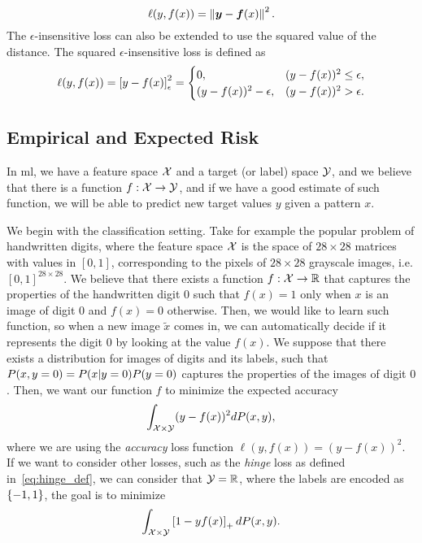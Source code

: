 \begin{equation}
    \label{eq:sqmulti_def}
    \lossf(y, f(x)) =  \norm{\fv{y} - \fv{f}(x)}^2.
\end{equation}
%
The $\epsilon$-insensitive loss can also be extended to use the squared value of the distance. The squared $\epsilon$-insensitive loss is defined as
\begin{equation}
    \label{eq:sqepsins_def}
    \lossf(y, f(x)) = \epsins{y - f(x)}^2 =
    \begin{cases}
        0, & (y - f(x))^2 \leq \epsilon ,\\
        (y - f(x))^2 - \epsilon, & (y - f(x))^2 > \epsilon .\\
    \end{cases}
\end{equation} 

\subsection{Empirical and Expected Risk} 
In \acrshort{ml}, we have a feature space $\mathcal{X}$ and a target (or label) space $\mathcal{Y}$, and we believe that there is a function $f: \mathcal{X} \to \mathcal{Y}$, and if we have a good estimate of such function, we will be able to predict new target values $y$ given a pattern $x$. 

%
We begin with the classification setting. Take for example the popular problem  of handwritten digits, where the feature space $\mathcal{X}$ is the space of $28 \times 28$ matrices with values in $[0, 1]$, corresponding to the pixels of $28 \times 28$ grayscale images, i.e. $[0, 1]^{28 \times 28}$. We believe that there exists a function $f: \mathcal{X} \to \mathbb{R}$ that captures the properties of the handwritten digit $0$ such that $f(x)=1$ only when $x$ is an image of digit $0$ and $f(x)=0$ otherwise. Then, we would like to learn such function, so when a new image $\tilde{x}$ comes in, we can automatically decide if it represents the digit $0$ by looking at the value $f(x)$.
%
We suppose that there exists a distribution for images of digits and its labels, such that $P(x, y=0) = P(x \vert y = 0) P(y = 0)$ captures the properties of the images of digit $0$. Then, we want our function $f$ to minimize the expected accuracy
$$ \int_{\mathcal{X} \times \mathcal{Y}} (y - f(x))^2 dP(x, y) ,$$
where we are using the \emph{accuracy} loss function $\ell(y, f(x)) = (y - f(x))^2$. 
%
If we want to consider other losses, such as the \emph{hinge} loss as defined in~\eqref{eq:hinge_def}, we can consider that $\mathcal{Y} = \mathbb{R}$, where the labels are encoded as $\left\{-1, 1\right\}$, the goal is to minimize 
$$ \int_{\mathcal{X} \times \mathcal{Y}} \left[1 - y f(x)\right]_{+} dP(x, y) .$$

